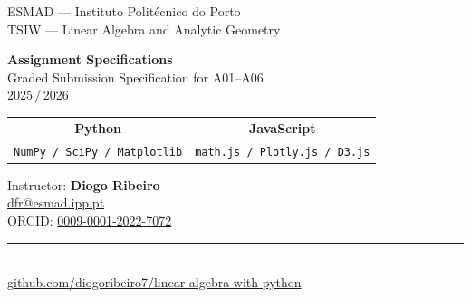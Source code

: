 \documentclass[a4paper,11pt]{article}
\begin{document}
\thispagestyle{empty}
\begin{center}
  \vspace*{3cm}

  {\color{midblue}\large ESMAD --- Instituto Polit\'ecnico do Porto}\\[0.3em]
  {\color{midblue}\large TSIW --- Linear Algebra and Analytic Geometry}

  \vspace{3cm}

  {\color{ippblue}\Huge\bfseries Assignment Specifications}\\[0.8em]
  {\color{darkgray}\LARGE Graded Submission Specification for A01--A06}\\[0.4em]
  {\color{darkgray}\Large 2025\,/\,2026}

  \vspace{2cm}

  \begin{tabular}{cc}
    \textcolor{pyborder}{\Large\textbf{Python}} & \textcolor{jsborder}{\Large\textbf{JavaScript}} \\
    \texttt{NumPy / SciPy / Matplotlib} & \texttt{math.js / Plotly.js / D3.js} \\
  \end{tabular}

  \vspace{2cm}

  {\large Instructor: \textbf{Diogo Ribeiro}}\\[0.3em]
  {\color{midblue}\href{mailto:dfr@esmad.ipp.pt}{dfr@esmad.ipp.pt}}\\[0.2em]
  {ORCID: \href{https://orcid.org/0009-0001-2022-7072}{0009-0001-2022-7072}}

  \vspace{2cm}

  {\color{midblue}\rule{0.6\textwidth}{0.4pt}}\\[0.6em]
  {\ttfamily\color{midblue}\href{https://github.com/diogoribeiro7/linear-algebra-with-python}{github.com/diogoribeiro7/linear-algebra-with-python}}

\end{center}
\newpage

\tableofcontents
\newpage
\end{document}
